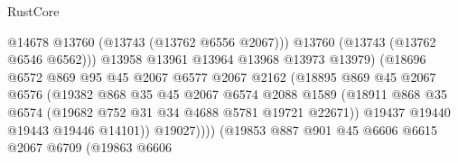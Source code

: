 \begin{lexlean}{RustCore}
\begin{coremodule}
                                            @14678
                                            @13760
                                            (@13743 (@13762 @6556 @2067)))
                                          @13760
                                          (@13743 (@13762 @6546 @6562)))
                                        @13958
                                        @13961
                                        @13964
                                        @13968
                                        @13973
                                        @13979)
                                      (@18696
                                        @6572
                                        @869
                                        @95
                                        @45
                                        @2067
                                        @6577
                                        @2067
                                        @2162
                                        (@18895
                                          @869
                                          @45
                                          @2067
                                          @6576
                                          (@19382
                                            @868
                                            @35
                                            @45
                                            @2067
                                            @6574
                                            @2088
                                            @1589
                                            (@18911
                                              @868
                                              @35
                                              @6574
                                              (@19682 @752 @31 @34 @4688 @5781 @19721 @22671))
                                            @19437
                                            @19440
                                            @19443
                                            @19446
                                            @14101))
                                        @19027))))
                                (@19853
                                  @887
                                  @901
                                  @45
                                  @6606
                                  @6615
                                  @2067
                                  @6709
                                  (@19863
                                    @6606

\end{coremodule}
\end{lexlean}

